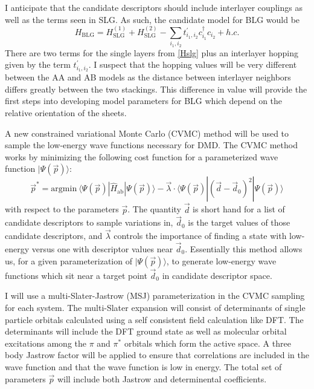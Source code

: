 \documentclass[12pt]{article}
\begin{document}
I anticipate that the candidate descriptors should include interlayer couplings as well as the terms seen in SLG.
As such, the candidate model for BLG would be
\begin{equation}
H_\text{BLG} = H_\text{SLG}^{(1)} + H_\text{SLG}^{(2)} - \sum_{i_1, i_2} t_{i_1, i_2}^\prime c_{i_1}^\dagger c_{i_2} + h.c.
\label{Hblg}
\end{equation}
There are two terms for the single layers from \eqref{Hslg} plus an interlayer hopping given by the term $t_{i_1, i_2}^\prime.$
I suspect that the hopping values will be very different between the AA and AB models as the distance between interlayer neighbors differs greatly between the two stackings.
This difference in value will provide the first steps into developing model parameters for BLG which depend on the relative orientation of the sheets.

A new constrained variational Monte Carlo (CVMC) method will be used to sample the low-energy wave functions necessary for DMD.
The CVMC method works by minimizing the following cost function for a parameterized wave function $|\Psi(\vec{p})\rangle$:
\begin{equation}
\vec{p}^* = \text{argmin} \ \langle \Psi(\vec{p}) | \hat{H}_\text{ab} | \Psi(\vec{p}) \rangle - \vec{\lambda} \cdot \langle \Psi(\vec{p}) | (\vec{d} - \vec{d}_0)^2 | \Psi(\vec{p}) \rangle 
\end{equation}
with respect to the parameters $\vec{p}$.
The quantity $\vec{d}$ is short hand for a list of candidate descriptors to sample variations in, $\vec{d}_0$ is the target values of those candidate descriptors, and $\vec{\lambda}$ controls the importance of finding a state with low-energy versus one with descriptor values near $\vec{d}_0$.
Essentially this method allows us, for a given parameterization of $|\Psi(\vec{p})\rangle$, to generate low-energy wave functions which sit near a target point $\vec{d}_0$ in candidate descriptor space.

I will use a multi-Slater-Jastrow (MSJ) parameterization in the CVMC sampling for each system.
The multi-Slater expansion will consist of determinants of single particle orbitals calculated using a self consistent field calculation like DFT.
The determinants will include the DFT ground state as well as molecular orbital excitations among the $\pi$ and $\pi^*$ orbitals which form the active space.
A three body Jastrow factor will be applied to ensure that correlations are included in the wave function and that the wave function is low in energy.
The total set of parameters $\vec{p}$ will include both Jastrow and determinental coefficients.
\end{document}
